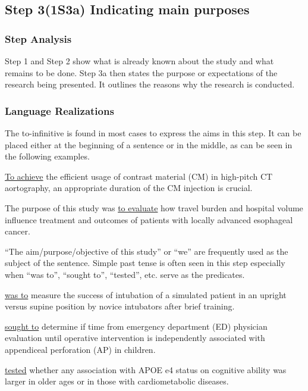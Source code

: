 \documentclass{ctexbook}
\begin{document}
  \subsection{Step 3(1S3a) Indicating main purposes}

    \subsubsection{Step Analysis}

    Step 1 and Step 2 show what is already known about the study and what remains to be done. Step 3a then states the purpose or expectations of the research being presented. It outlines the reasons why the research is conducted.

    \subsubsection{Language Realizations}

    The to-infinitive is found in most cases to express the aims in this step. It can be placed either at the beginning of a sentence or in the middle, as can be seen in the following examples.

    \begin{eg}{}
      \uline{To achieve} the efficient usage of contrast material (CM) in high-pitch CT aortography, an appropriate duration of the CM injection is crucial.
    \end{eg}

    \begin{eg}{}
      The purpose of this study was \uline{to evaluate} how travel burden and hospital volume influence treatment and outcomes of patients with locally advanced esophageal cancer.
    \end{eg}

    ``The aim/purpose/objective of this study'' or ``we'' are frequently used as the subject of the sentence. Simple past tense is often seen in this step especially when ``was to'', ``sought to'', ``tested'', etc. serve as the predicates.

    \begin{eg}{}
       \uline{was to} measure the success of intubation of a simulated patient in an upright versus supine position by novice intubators after brief training.
    \end{eg}
    \begin{eg}{}
       \uline{sought to} determine if time from emergency department (ED) physician evaluation until operative intervention is independently associated with appendiceal perforation (AP) in children.
    \end{eg}
    \begin{eg}{}
       \uline{tested} whether any association with APOE e4 status on cognitive ability was larger in older ages or in those with cardiometabolic diseases.
    \end{eg}
    
\end{document}
